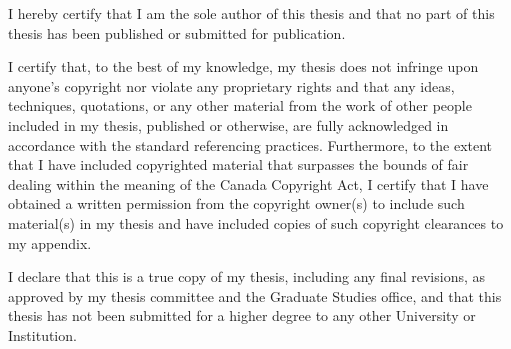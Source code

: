 
I hereby certify that I am the sole author of this thesis and that no part of this thesis has been published or submitted for publication.

I certify that, to the best of my knowledge, my thesis does not infringe upon anyone’s copyright nor violate any proprietary rights and that any ideas, techniques, quotations, or any other material from the work of other people included in my thesis, published or otherwise, are fully acknowledged in accordance with the standard referencing practices. Furthermore, to the extent that I have included copyrighted material that surpasses the bounds of fair dealing within the meaning of the Canada Copyright Act, I certify that I have obtained a written permission from the copyright owner(s) to include such material(s) in my thesis and have included copies of such copyright clearances to my appendix. 
 
I declare that this is a true copy of my thesis, including any final revisions, as approved by my thesis committee and the Graduate Studies office, and that this thesis has not been submitted for a higher degree to any other University or Institution.